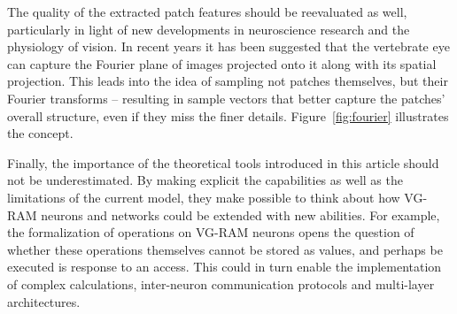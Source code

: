 \documentclass[twocolumn, 9pt]{jsproceedings}
\begin{document}
The quality of the extracted patch features should be reevaluated as well, particularly in light of new developments in neuroscience research and the physiology of vision. In recent years it has been suggested that the vertebrate eye can capture the Fourier plane of images projected onto it along with its spatial projection. This leads into the idea of sampling not patches themselves, but their Fourier transforms -- resulting in sample vectors that better capture the patches' overall structure, even if they miss the finer details. Figure~\ref{fig:fourier} illustrates the concept.

Finally, the importance of the theoretical tools introduced in this article should not be underestimated. By making explicit the capabilities as well as the limitations of the current model, they make possible to think about how VG-RAM neurons and networks could be extended with new abilities. For example, the formalization of operations on VG-RAM neurons opens the question of whether these operations themselves cannot be stored as values, and perhaps be executed is response to an access. This could in turn enable the implementation of complex calculations, inter-neuron communication protocols and multi-layer architectures.

\footnotesize




\normalsize
\end{document}
